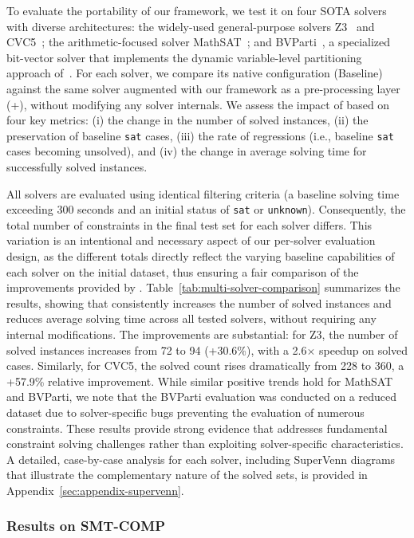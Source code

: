 To evaluate the portability of our framework, we test it on four SOTA solvers with diverse architectures: the widely-used general-purpose solvers Z3~\cite{demoura2008z3} and CVC5~\cite{cvc5}; the arithmetic-focused solver MathSAT~\cite{mathsat5}; and BVParti~\cite{bvparti2025}, a specialized bit-vector solver that implements the dynamic variable-level partitioning approach of~\citet{zhao2024distributed}. For each solver, we compare its native configuration (Baseline) against the same solver augmented with our framework as a pre-processing layer (+\tool{}), without modifying any solver internals. We assess the impact of \tool{} based on four key metrics: (i) the change in the number of solved instances, (ii) the preservation of baseline \texttt{sat} cases, (iii) the rate of regressions (i.e., baseline \texttt{sat} cases becoming unsolved), and (iv) the change in average solving time for successfully solved instances.

All solvers are evaluated using identical filtering criteria (a baseline solving time exceeding 300 seconds and an initial status of \texttt{sat} or \texttt{unknown}). Consequently, the total number of constraints in the final test set for each solver differs. This variation is an intentional and necessary aspect of our per-solver evaluation design, as the different totals directly reflect the varying baseline capabilities of each solver on the initial dataset, thus ensuring a fair comparison of the improvements provided by \tool{}.
Table~\ref{tab:multi-solver-comparison} summarizes the results, showing that \tool{} consistently increases the number of solved instances and reduces average solving time across all tested solvers, without requiring any internal modifications. The improvements are substantial: for Z3, the number of solved instances increases from 72 to 94 (+30.6\%), with a 2.6$\times$ speedup on solved cases. Similarly, for CVC5, the solved count rises dramatically from 228 to 360, a +57.9\% relative improvement. While similar positive trends hold for MathSAT and BVParti, we note that the BVParti evaluation was conducted on a reduced dataset due to solver-specific bugs preventing the evaluation of numerous constraints. These results provide strong evidence that \tool{} addresses fundamental constraint solving challenges rather than exploiting solver-specific characteristics. A detailed, case-by-case analysis for each solver, including SuperVenn diagrams that illustrate the complementary nature of the solved sets, is provided in Appendix~\ref{sec:appendix-supervenn}.
\subsubsection{Results on SMT-COMP}

